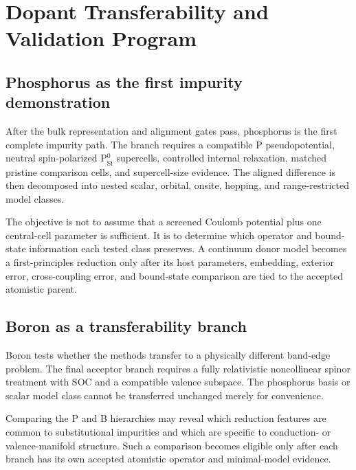 \chapter{Dopant Transferability and Validation Program}

\label{ch:dopant-transferability}


\section{Phosphorus as the first impurity demonstration}


After the bulk representation and alignment gates pass, phosphorus is the first
complete impurity path. The branch requires a compatible P pseudopotential,
neutral spin-polarized P$_\mathrm{Si}^{0}$ supercells, controlled internal
relaxation, matched pristine comparison cells, and supercell-size evidence. The
aligned difference is then decomposed into nested scalar, orbital, onsite,
hopping, and range-restricted model classes.

The objective is not to assume that a screened Coulomb potential plus one
central-cell parameter is sufficient. It is to determine which operator and
bound-state information each tested class preserves. A continuum donor model
becomes a first-principles reduction only after its host parameters, embedding,
exterior error, cross-coupling error, and bound-state comparison are tied to the
accepted atomistic parent.

\section{Boron as a transferability branch}


Boron tests whether the methods transfer to a physically different band-edge
problem. The final acceptor branch requires a fully relativistic noncollinear
spinor treatment with SOC and a compatible valence subspace. The phosphorus
basis or scalar model class cannot be transferred unchanged merely for
convenience.

Comparing the P and B hierarchies may reveal which reduction features are common
to substitutional impurities and which are specific to conduction- or
valence-manifold structure. Such a comparison becomes eligible only after each
branch has its own accepted atomistic operator and minimal-model evidence.

